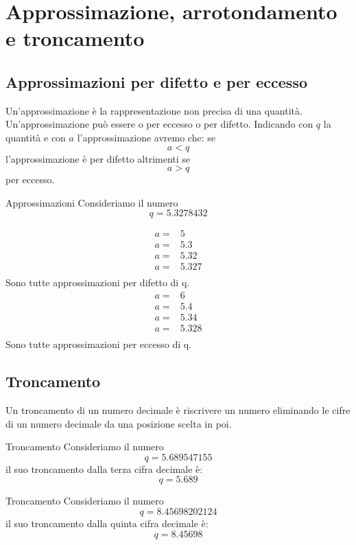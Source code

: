 \chapter{Approssimazione, arrotondamento e troncamento}
\label{cha:Approssimazione}
\section{Approssimazioni per difetto e per eccesso}
Un'approssimazione è la rappresentazione non precisa di una quantità. Un'approssimazione  può essere o per eccesso o per difetto. Indicando con  $q$ la quantità e con $a$  l'approssimazione avremo che:
se\[a<q\] l'approssimazione è per difetto altrimenti se \[a>q\] per eccesso.
  \begin{esempiot}{Approssimazioni}{}
	Consideriamo il numero\[q=\num{5,3278432}\]
\end{esempiot}
\begin{align*}
	a=&\num{5}\\
	a=&\num{5,3}\\
	a=&\num{5,32}\\
	a=&\num{5,327}\\
\end{align*}
Sono tutte approssimazioni per difetto di q.
\begin{align*}
	a=&\num{6}\\
	a=&\num{5,4}\\
	a=&\num{5,34}\\
	a=&\num{5,328}\\
\end{align*}
Sono tutte approssimazioni per eccesso di q.
\section{Troncamento}
Un troncamento di un numero decimale è riscrivere un numero eliminando le cifre di un numero decimale da una posizione scelta in poi. 
  \begin{esempiot}{Troncamento}{}
	Consideriamo il numero\[q=\num{5.689547155}\]
	il suo troncamento dalla terza cifra decimale è:
	\[q=\num{5.689}\]
\end{esempiot}
  \begin{esempiot}{Troncamento}{}
	Consideriamo il numero\[q=\num{8.45698202124}\]
	il suo troncamento dalla quinta cifra decimale è:
	\[q=\num{8.45698}\]
\end{esempiot}
